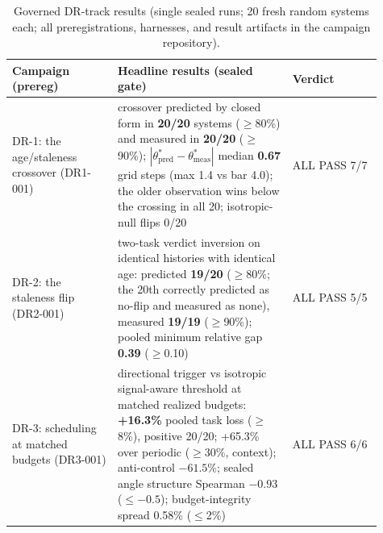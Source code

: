 \documentclass[letterpaper,onecolumn]{IEEEtran}
\theoremstyle{definition}
\theoremstyle{remark}
\begin{document}
\begin{table}[t]
\caption{Governed DR-track results (single sealed runs; 20 fresh random
systems each; all preregistrations, harnesses, and result artifacts in
the campaign repository).}
\label{tab:dr-evidence}
\centering
\begin{tabular}{@{}p{0.26\linewidth}p{0.43\linewidth}p{0.22\linewidth}@{}}
\toprule
\textbf{Campaign (prereg)} & \textbf{Headline results (sealed gate)} & \textbf{Verdict} \\
\midrule
DR-1: the age/staleness crossover (DR1-001) &
crossover predicted by closed form in \textbf{20/20} systems
($\ge$80\%) and measured in \textbf{20/20} ($\ge$90\%);
$|\theta^{*}_{\mathrm{pred}}-\theta^{*}_{\mathrm{meas}}|$ median
\textbf{0.67} grid steps (max 1.4 vs bar 4.0); the older observation
wins below the crossing in all 20; isotropic-null flips 0/20 & ALL
PASS 7/7 \\
\addlinespace
DR-2: the staleness flip (DR2-001) &
two-task verdict inversion on identical histories with identical
age: predicted \textbf{19/20} ($\ge$80\%; the 20th correctly predicted
as no-flip and measured as none), measured \textbf{19/19} ($\ge$90\%);
pooled minimum relative gap \textbf{0.39} ($\ge$0.10) & ALL PASS 5/5 \\
\addlinespace
DR-3: scheduling at matched budgets (DR3-001) &
directional trigger vs isotropic signal-aware threshold at matched
realized budgets: \textbf{+16.3\%} pooled task loss ($\ge$8\%),
positive 20/20; +65.3\% over periodic ($\ge$30\%, context);
anti-control $-61.5\%$; sealed angle structure Spearman
\textbf{$-0.93$} ($\le-0.5$); budget-integrity spread 0.58\% ($\le$2\%)
& ALL PASS 6/6 \\
\bottomrule
\end{tabular}
\end{table}
\end{document}
